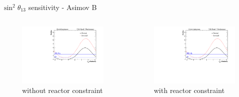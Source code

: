\documentclass{beamer}
\newcommand{\sinsqthetaonethree}{$\sin^2\theta_{13}$\xspace}
\begin{document}
\begin{frame}{\sinsqthetaonethree sensitivity - Asimov B}
	\centering
	\begin{columns}
		\begin{column}{0.5\paperwidth}
			\begin{figure}
				\includegraphics[trim={0cm 0cm 0cm 0cm}, clip, scale=0.33] {images/sensitivity/th13_global_t2k}
				\caption*{without reactor constraint}
			\end{figure}
		\end{column}
		\begin{column}{0.5\paperwidth}
			\begin{figure}
				\includegraphics[trim={0cm 0cm 0cm 0cm}, clip, scale=0.33] {images/sensitivity/th13_global_t2k}
				\caption*{with reactor constraint}
			\end{figure}
		\end{column}
	\end{columns}
\end{frame}
\end{document}
